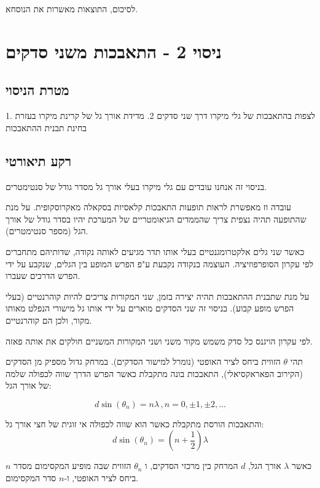 \documentclass[14pt]{extarticle}
\begin{document}
לסיכום, התוצאות מאשרות את הנוסחא.

\newpage
\section*{ניסוי 2 - התאבכות משני סדקים}

\subsection*{מטרת הניסוי}
1. לצפות בהתאבכות של גלי מיקרו דרך שני סדקים
2. מדידת אורך גל של קרינת מיקרו בעזרת בחינת תבנית ההתאבכות

\subsection*{רקע תיאורטי}
בניסוי זה אנחנו עובדים עם גלי מיקרו בעלי אורך גל מסדר גודל של סנטימטרים.

עובדה וז מאפשרת לראות תופעות התאבכות קלאסיות בסקאלה מאקרוסקופית.
על מנת שהתופעה תהיה נצפית צריך שהממדים הגיאומטריים של המערכת יהיו בסדר גודל של אורך הגל (מספר סנטימטרים).

כאשר שני גלים אלקטרומגנטיים בעלי אותו תדר מגיעים לאותה נקודה, שדותיהם מתחברים לפי עקרון הסופרפוזיציה.
העוצמה בנקודה נקבעת ע"פ הפרש המופע בין הגלים, שנקבע על ידי הפרש הדרכים שעברו.

על מנת שתבנית ההתאבכות תהיה יצירה בזמן, שני המקורות צריכים להיות קוהרנטיים (בעלי הפרש מופע קבוע).
בניסוי זה שני הסדקים מוארים על ידי אותו גל מישורי הנפלט מאותו מקור, ולכן הם קוהרנטיים.

לפי עקרון הויגנס כל סדק משמש מקור משני ושני המקורות המשניים חולקים את אותה פאזה.

תהי $\theta$ הזווית ביחס לציר האופטי (נומרל למישור הסדקים).
במרחק גדול מספיק מן הסדקים (הקירוב הפאראקסיאלי), התאבכות בונה מתקבלת כאשר הפרש הדרך שווה לכפולה שלמה של אורך הגל:

\begin{equation}
    d \sin(\theta_n) = n \lambda \, ,n=0,\pm 1, \pm 2, \ldots
\end{equation}

והתאבכות הורסת מתקבלת כאשר הוא שווה לכפולה אי זוגית של חצי אורך גל:
\begin{equation}
    d \sin(\theta_n) = (n + \frac{1}{2}) \lambda
\end{equation}

כאשר $\lambda$ אורך הגל, $d$ המרחק בין מרכזי הסדקים, ו $\theta_n$ הזווית שבה מופיע המקסימום מסדר $n$ ביחס לציר האופטי, ו-$n$ סדר המקסימום.
\end{document}
